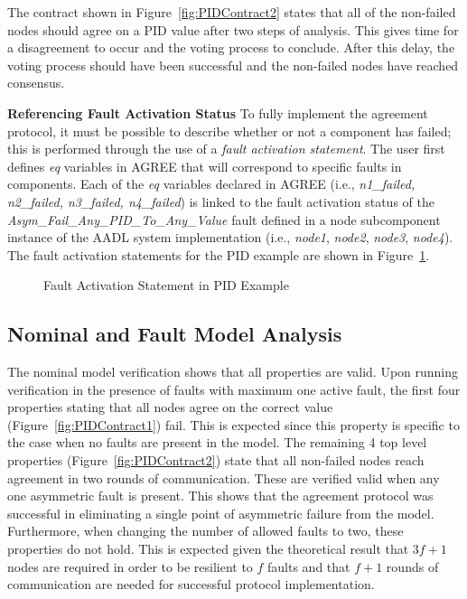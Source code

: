 The contract shown in Figure~\ref{fig:PIDContract2} states that all of the non-failed nodes should agree on a PID value after two steps of analysis. This gives time for a disagreement to occur and the voting process to conclude. After this delay, the voting process should have been successful and the non-failed nodes have reached consensus. 


\textbf{Referencing Fault Activation Status}
To fully implement the agreement protocol, it must be possible to describe whether or not a component has failed; this is performed through the use of a \textit{fault activation statement}. The user first defines \textit{eq} variables in AGREE that will correspond to specific faults in components. Each of the \textit{eq} variables declared in AGREE (i.e., \textit{n1\_failed, n2\_failed, n3\_failed, n4\_failed}) is linked to the fault activation status of the \textit{Asym\_Fail\_Any\_PID\_To\_Any\_Value} fault defined in a node subcomponent instance of the %
AADL system implementation (i.e., \textit{node1}, \textit{node2}, \textit{node3}, \textit{node4}). The fault activation statements for the PID example are shown in Figure~\ref{fig:PID_faultActivationStmt}.

\begin{figure}[!htb]
        \caption{\label{fig:PID_faultActivationStmt} Fault Activation Statement in PID Example}
\end{figure}

\subsection{Nominal and Fault Model Analysis}
The nominal model verification shows that all properties are valid. Upon running verification in the presence of faults with maximum one active fault, the first four properties stating that all nodes agree on the correct value (Figure~\ref{fig:PIDContract1}) fail. This is expected since this property is specific to the case when no faults are present in the model. The remaining 4 top level properties (Figure~\ref{fig:PIDContract2}) state that all non-failed nodes reach agreement in two rounds of communication. These are verified valid when any one asymmetric fault is present. This shows that the agreement protocol was successful in eliminating a single point of asymmetric failure from the model. Furthermore, when changing the number of allowed faults to two, these properties do not hold. This is expected given the theoretical result that $3f+1$ nodes are required in order to be resilient to $f$ faults and that $f+1$ rounds of communication are needed for successful protocol implementation.


